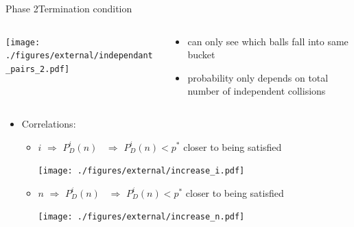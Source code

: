 \documentclass[aspectratio=169, hyperref={colorlinks=true, allcolors=SecondaryColor}, c]{beamer}
\begin{document}
	\begin{frame}[fragile]{Phase 2}{Termination condition}
		\begin{columns}
			\begin{column}{0.5\textwidth}
				\texttt{[image: ./figures/external/independant\_pairs\_2.pdf]}
			\end{column}
			\begin{column}{0.5\textwidth}
				\begin{itemize}
					\item can only see which balls fall into same bucket
					\item probability \alert{only} depends on \alert{total number of independent collisions}
				\end{itemize}
			\end{column}
		\end{columns}
		\begin{itemize}
			\item \alert{Correlations}:
			\begin{itemize}
				\item {\thickuparrow} $i$ \alert{$\Rightarrow$} $P^i_D(n)$ {\thickdownarrow}\, \alert{$\Rightarrow$} $P^i_D(n) < p^*$ closer to being satisfied %
				\vspace{-0.4cm}

				\texttt{[image: ./figures/external/increase\_i.pdf]} %
				\item {\thickuparrow} $n$ \alert{$\Rightarrow$} $P^i_D(n)$ {\thickdownarrow}\, \alert{$\Rightarrow$} $P^i_D(n) < p^*$ closer to being satisfied %
				\vspace{-0.4cm}

				\texttt{[image: ./figures/external/increase\_n.pdf]} %
			\end{itemize}
		\end{itemize}
	\end{frame}
\end{document}
